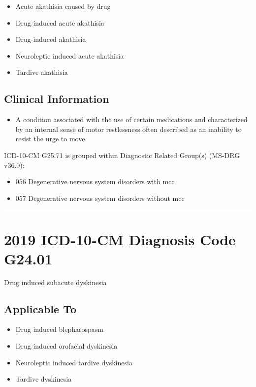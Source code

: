 \begin{itemize}
\tightlist
\item
  Acute akathisia caused by drug
\item
  Drug induced acute akathisia
\item
  Drug-induced akathisia
\item
  Neuroleptic induced acute akathisia
\item
  Tardive akathisia
\end{itemize}

\hypertarget{clinical-information}{%
\subsection{Clinical Information}\label{clinical-information}}

\begin{itemize}
\tightlist
\item
  A condition associated with the use of certain medications and characterized by an internal sense of motor restlessness often described as an inability to resist the urge to move.
\end{itemize}

ICD-10-CM G25.71 is grouped within Diagnostic Related Group(s) (MS-DRG v36.0):

\begin{itemize}
\tightlist
\item
  056 Degenerative nervous system disorders with mcc
\item
  057 Degenerative nervous system disorders without mcc
\end{itemize}

\begin{center}\rule{0.5\linewidth}{\linethickness}\end{center}

\hypertarget{icd-10-cm-diagnosis-code-g24.01}{%
\section{2019 ICD-10-CM Diagnosis Code G24.01}\label{icd-10-cm-diagnosis-code-g24.01}}

Drug induced subacute dyskinesia

\hypertarget{applicable-to-2}{%
\subsection{Applicable To}\label{applicable-to-2}}

\begin{itemize}
\tightlist
\item
  Drug induced blepharospasm
\item
  Drug induced orofacial dyskinesia
\item
  Neuroleptic induced tardive dyskinesia
\item
  Tardive dyskinesia
\end{itemize}

